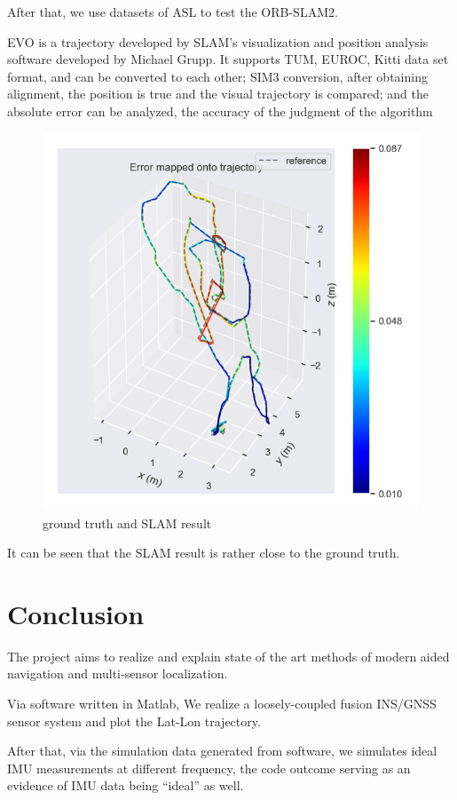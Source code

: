 \documentclass[conference]{IEEEtran}
\begin{document}
After that, we use datasets of ASL to test the ORB-SLAM2.

EVO is a trajectory developed by SLAM's visualization and position analysis software developed by Michael Grupp. 
It supports TUM, EUROC, Kitti data set format, and can be converted to each other; 
SIM3 conversion, after obtaining alignment, 
the position is true and the visual trajectory is compared; 
and the absolute error can be analyzed, the accuracy of the judgment of the algorithm

\begin{figure}[htbp]
    \centerline{\includegraphics[width=0.9\columnwidth]{ape_map0.png}}
    \caption{ground truth and SLAM result}
\end{figure}

It can be seen that the SLAM result is rather close to the ground truth.


\section{Conclusion}

The project aims to realize and explain state of the art methods of modern aided navigation and multi-sensor localization.

Via software written in Matlab, We realize a loosely-coupled fusion INS/GNSS sensor system and plot the Lat-Lon trajectory.

After that, via the simulation data generated from software, we simulates ideal IMU measurements at different frequency, the code outcome serving as an evidence of IMU data being “ideal” as well. 
\end{document}
